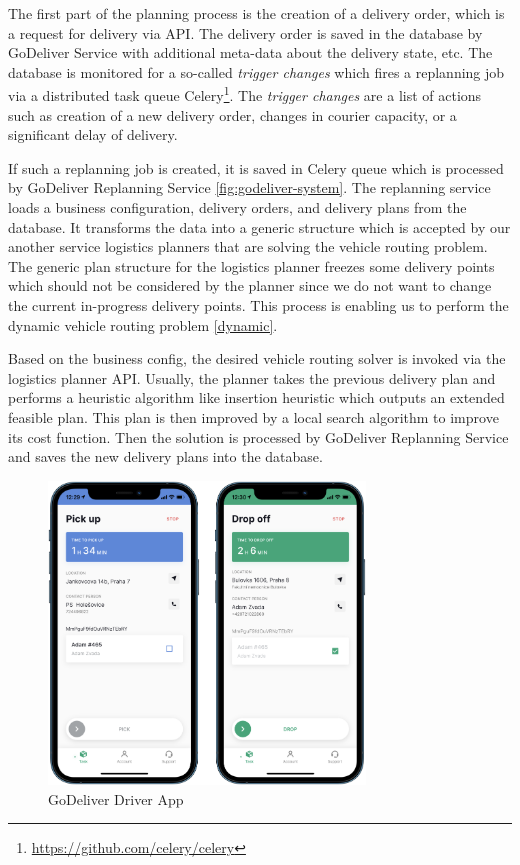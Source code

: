 The first part of the planning process is the creation of a delivery order, which is a request for delivery via API. The delivery order is saved in the database by GoDeliver Service with additional meta-data about the delivery state, etc. The database is monitored for a so-called \textit{trigger changes} which fires a replanning job via a distributed task queue Celery\footnote{\url{https://github.com/celery/celery}}. The \textit{trigger changes} are a list of actions such as creation of a new delivery order, changes in courier capacity, or a significant delay of delivery.

If such a replanning job is created, it is saved in Celery queue which is processed by GoDeliver Replanning Service \ref{fig:godeliver-system}. The replanning service loads a business configuration, delivery orders, and delivery plans from the database. It transforms the data into a generic structure which is accepted by our another service logistics planners that are solving the vehicle routing problem. The generic plan structure for the logistics planner freezes some delivery points which should not be considered by the planner since we do not want to change the current in-progress delivery points. This process is enabling us to perform the dynamic vehicle routing problem \ref{dynamic}.

Based on the business config, the desired vehicle routing solver is invoked via the logistics planner API. Usually, the planner takes the previous delivery plan and performs a heuristic algorithm like insertion heuristic which outputs an extended feasible plan. This plan is then improved by a local search algorithm to improve its cost function. Then the solution is processed by GoDeliver Replanning Service and saves the new delivery plans into the database.

\begin{figure}[ht]
    \centering
    \includegraphics[width=0.75\textwidth]{resources/implementation/godeliver-app.png}
    \caption{GoDeliver Driver App}
    \label{fig:godeliver-app}
\end{figure}

